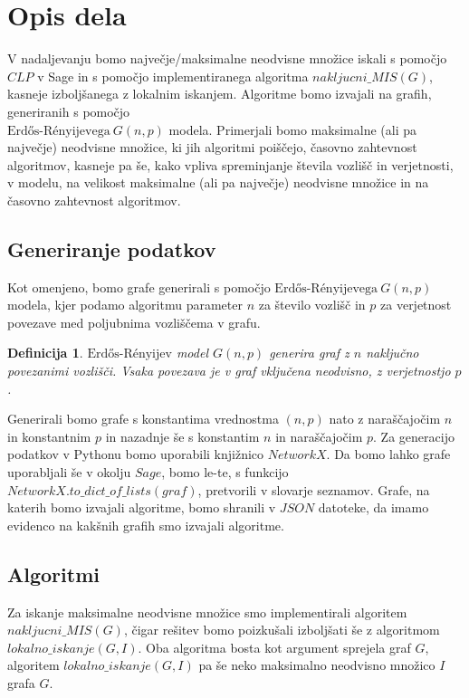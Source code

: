 \documentclass[a4paper, 12pt]{article}
\newtheorem{definicija}{Definicija}
\begin{document}
\newpage

\section{Opis dela}
V nadaljevanju bomo največje/maksimalne neodvisne množice iskali s pomočjo $CLP$ v Sage in s pomočjo implementiranega algoritma $nakljucni\_MIS(G)$,  kasneje izboljšanega z lokalnim
iskanjem. Algoritme bomo izvajali na grafih, generiranih s pomočjo \\
$\text{Erdős-Rényijevega}\ G(n,p)$ modela. Primerjali bomo maksimalne (ali pa največje) neodvisne množice, ki jih algoritmi poiščejo,
časovno zahtevnost algoritmov, kasneje pa še, kako vpliva spreminjanje števila vozlišč in verjetnosti, v modelu, na velikost maksimalne (ali pa največje) neodvisne množice in na
časovno zahtevnost algoritmov.

\subsection{Generiranje podatkov}
Kot omenjeno, bomo grafe generirali s pomočjo $\text{Erdős-Rényijevega}\ G(n,p)$ modela, kjer podamo algoritmu parameter $n$ za število vozlišč in $p$ za verjetnost povezave med poljubnima vozliščema v grafu.

\begin{definicija}
    $\text{Erdős-Rényijev}$ model $G(n, p)$ generira graf z $n$ naključno povezanimi vozlišči. Vsaka povezava je v graf vključena neodvisno, z verjetnostjo $p$.
\end{definicija}

\noindent Generirali bomo grafe s konstantima vrednostma $(n,p)$ nato z naraščajočim $n$ in konstantnim $p$ in nazadnje še s konstantim $n$ in naraščajočim $p$. Za generacijo podatkov v Pythonu bomo uporabili
knjižnico $NetworkX$. Da bomo lahko grafe uporabljali še v okolju $Sage$, bomo le-te, s funkcijo $NetworkX.to\_dict\_of\_lists(graf)$, pretvorili v slovarje seznamov.
Grafe, na katerih bomo izvajali algoritme, bomo shranili v $JSON$ datoteke, da imamo evidenco na kakšnih grafih smo izvajali algoritme.


\subsection{Algoritmi}

Za iskanje maksimalne neodvisne množice smo implementirali algoritem $nakljucni\_MIS(G)$, čigar rešitev bomo poizkušali izboljšati še z algoritmom $lokalno\_iskanje(G, I)$. Oba
algoritma bosta kot argument sprejela graf $G$, algoritem $lokalno\_iskanje(G, I)$ pa še neko maksimalno neodvisno množico $I$ grafa $G$.
\end{document}
